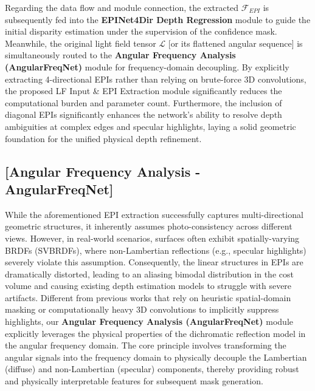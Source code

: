 \documentclass[lettersize,journal]{IEEEtran}
\begin{document}
Regarding the data flow and module connection, the extracted $\mathcal{F}_{EPI}$ is subsequently fed into the \textbf{EPINet4Dir Depth Regression} module to guide the initial disparity estimation under the supervision of the confidence mask. Meanwhile, the original light field tensor $\mathcal{L}$  [or its flattened angular sequence] is simultaneously routed to the \textbf{Angular Frequency Analysis (AngularFreqNet)} module for frequency-domain decoupling. By explicitly extracting 4-directional EPIs rather than relying on brute-force 3D convolutions, the proposed LF Input \& EPI Extraction module significantly reduces the computational burden and parameter count. Furthermore, the inclusion of diagonal EPIs significantly enhances the network's ability to resolve depth ambiguities at complex edges and specular highlights, laying a solid geometric foundation for the unified physical depth refinement.

\subsection{ [Angular Frequency Analysis - AngularFreqNet]}

While the aforementioned EPI extraction successfully captures multi-directional geometric structures, it inherently assumes photo-consistency across different views. However, in real-world scenarios, surfaces often exhibit spatially-varying BRDFs (SVBRDFs), where non-Lambertian reflections (e.g., specular highlights) severely violate this assumption. Consequently, the linear structures in EPIs are dramatically distorted, leading to an aliasing bimodal distribution in the cost volume and causing existing depth estimation models to struggle with severe artifacts. Different from previous works that rely on heuristic spatial-domain masking or computationally heavy 3D convolutions to implicitly suppress highlights, our \textbf{Angular Frequency Analysis (AngularFreqNet)} module explicitly leverages the physical properties of the dichromatic reflection model in the angular frequency domain. The core principle involves transforming the angular signals into the frequency domain to physically decouple the Lambertian (diffuse) and non-Lambertian (specular) components, thereby providing robust and physically interpretable features for subsequent mask generation.
\end{document}
